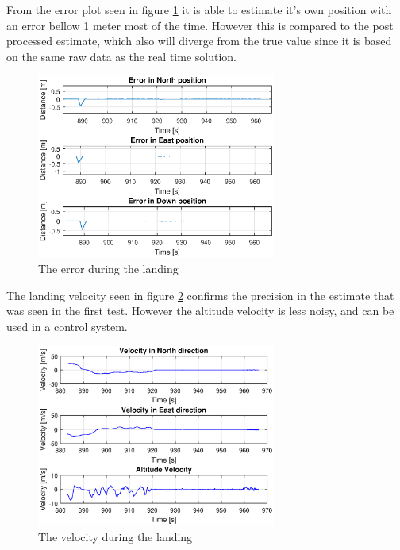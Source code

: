 From the error plot seen in figure \ref{figure:landingErrorNorthEastDownFlight} it is able to estimate it's own position with an error bellow 1 meter most of the time. However this is compared to the post processed estimate, which also will diverge from the true value since it is based on the same raw data as the real time solution.

\begin{figure}[H]
	\centering
		\includegraphics[width=0.7\textwidth]{figs/plots/landingErrorNorthEastDownFlight.eps}
		\caption{The error during the landing}
		\label{figure:landingErrorNorthEastDownFlight}
\end{figure}
The landing velocity seen in figure \ref{figure:landingVelocity} confirms the precision in the estimate that was seen in the first test. However the altitude velocity is less noisy, and can be used in a control system.
\begin{figure}[H]
	\centering
		\includegraphics[width=0.7\textwidth]{figs/plots/landingVelocity.eps}
		\caption{The velocity during the landing}
		\label{figure:landingVelocity}
\end{figure}
\cleardoublepage